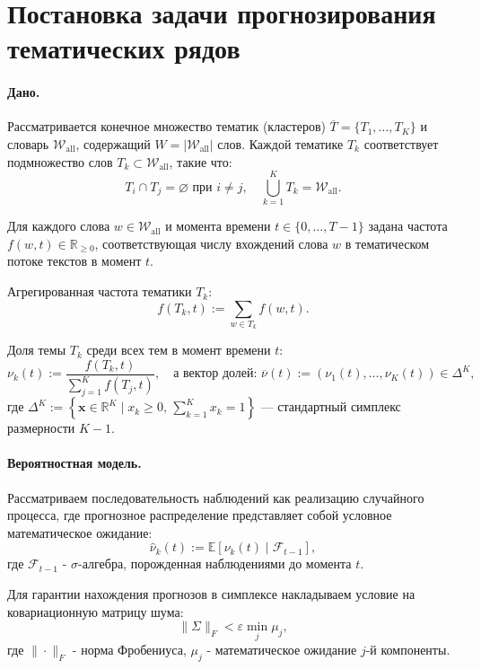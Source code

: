 \documentclass[14pt,a4paper]{article}
\begin{document}
\newpage
\section{Постановка задачи прогнозирования тематических рядов}

\paragraph{Дано.}
Рассматривается конечное множество тематик (кластеров) $\overline{T} = \{T_1, \dots, T_K\}$ и словарь $\mathcal{W}_{\mathrm{all}}$, содержащий $W = |\mathcal{W}_{\mathrm{all}}|$ слов. Каждой тематике $T_k$ соответствует подмножество слов $T_k \subset \mathcal{W}_{\mathrm{all}}$, такие что:
\[
T_i \cap T_j = \varnothing \text{ при } i \ne j, \quad \bigcup_{k=1}^K T_k = \mathcal{W}_{\mathrm{all}}.
\]

Для каждого слова $w \in \mathcal{W}_{\mathrm{all}}$ и момента времени $t \in \{0, \dots, T{-}1\}$ задана частота $f(w, t) \in \mathbb{R}_{\ge 0}$, соответствующая числу вхождений слова $w$ в тематическом потоке текстов в момент $t$.

Агрегированная частота тематики $T_k$:
\[
f(T_k, t) := \sum_{w \in T_k} f(w, t).
\]

Доля темы $T_k$ среди всех тем в момент времени $t$:
\[
\nu_k(t) := \frac{f(T_k, t)}{\sum_{j=1}^K f(T_j, t)}, \quad \text{а вектор долей: } \overline{\nu}(t) := (\nu_1(t), \dots, \nu_K(t)) \in \Delta^K,
\]
где $\Delta^K := \left\{ \mathbf{x} \in \mathbb{R}^K \mid x_k \ge 0,\, \sum_{k=1}^K x_k = 1 \right\}$ — стандартный симплекс размерности $K{-}1$.


\paragraph{Вероятностная модель.} 
Рассматриваем последовательность наблюдений как реализацию случайного процесса, где прогнозное распределение представляет собой условное математическое ожидание:
\[
\widehat{\nu}_k(t) := \mathbb{E}[\nu_k(t) \mid \mathcal{F}_{t-1}],
\]
где $\mathcal{F}_{t-1}$ - $\sigma$-алгебра, порожденная наблюдениями до момента $t$.

Для гарантии нахождения прогнозов в симплексе накладываем условие на ковариационную матрицу шума:
\[
\|\Sigma\|_F < \varepsilon \min_{j} \mu_j,
\]
где $\|\cdot\|_F$ - норма Фробениуса, $\mu_j$ - математическое ожидание $j$-й компоненты.
\end{document}
